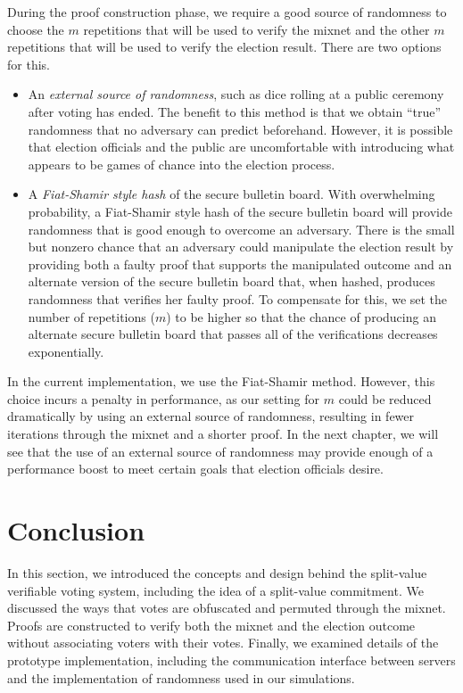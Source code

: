 During the proof construction phase, we require a good source of randomness to choose the $m$ repetitions that will be used to verify the mixnet and the other $m$ repetitions that will be used to verify the election result. There are two options for this.
\begin{itemize}
\item An \emph{external source of randomness}, such as dice rolling at a public ceremony after voting has ended. The benefit to this method is that we obtain ``true'' randomness that no adversary can predict beforehand. However, it is possible that election officials and the public are uncomfortable with introducing what appears to be games of chance into the election process.
\item A \emph{Fiat-Shamir style hash} of the secure bulletin board. With overwhelming probability, a Fiat-Shamir style hash of the secure bulletin board will provide randomness that is good enough to overcome an adversary. There is the small but nonzero chance that an adversary could manipulate the election result by providing both a faulty proof that supports the manipulated outcome and an alternate version of the secure bulletin board that, when hashed, produces randomness that verifies her faulty proof. To compensate for this, we set the number of repetitions ($m$) to be higher so that the chance of producing an alternate secure bulletin board that passes all of the verifications decreases exponentially.
\end{itemize}

In the current implementation, we use the Fiat-Shamir method. However, this choice incurs a penalty in performance, as our setting for $m$ could be reduced dramatically by using an external source of randomness, resulting in fewer iterations through the mixnet and a shorter proof. In the next chapter, we will see that the use of an external source of randomness may provide enough of a performance boost to meet certain goals that election officials desire.

\section{Conclusion} \label{sv:conclusion}

In this section, we introduced the concepts and design behind the split-value verifiable voting system, including the idea of a split-value commitment. We discussed the ways that votes are obfuscated and permuted through the mixnet. Proofs are constructed to verify both the mixnet and the election outcome without associating voters with their votes. Finally, we examined details of the prototype implementation, including the communication interface between servers and the implementation of randomness used in our simulations.

